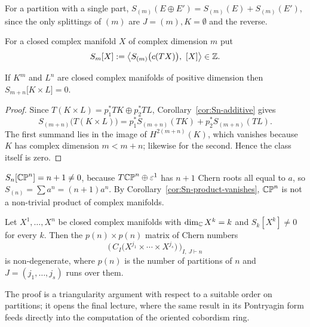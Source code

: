 \begin{corollary}\label{cor:Sn-additive}
For a partition with a single part, $S_{(m)}(E\oplus E')=S_{(m)}(E)+S_{(m)}(E')$,
since the only splittings of $(m)$ are $J=(m),K=\emptyset$ and the reverse.
\end{corollary}

\begin{definition}
For a closed complex manifold $X$ of complex dimension $m$ put
\[
S_m[X]:=\big\langle S_{(m)}\big(c(TX)\big),\ [X]\big\rangle\in\mathbb{Z} .
\]
\end{definition}

\begin{corollary}\label{cor:Sn-product-vanishes}
If $K^m$ and $L^{n}$ are closed complex manifolds of positive dimension then
$S_{m+n}\big[K\times L\big]=0$.
\end{corollary}

\begin{proof}
Since $T(K\times L)=p_1^*TK\oplus p_2^*TL$,
Corollary~\ref{cor:Sn-additive} gives
\[
S_{(m+n)}\big(T(K\times L)\big)
=p_1^*S_{(m+n)}(TK)+p_2^*S_{(m+n)}(TL).
\]
The first summand lies in the image of $H^{2(m+n)}(K)$, which vanishes because
$K$ has complex dimension $m<m+n$; likewise for the second. Hence the class
itself is zero.
\end{proof}

\begin{example}
$S_n[\mathbb{CP}^n]=n+1\neq0$, because $T\mathbb{CP}^n\oplus\varepsilon^1$ has $n+1$ Chern roots all
equal to $a$, so $S_{(n)}=\sum a^n=(n+1)a^n$. By
Corollary~\ref{cor:Sn-product-vanishes}, $\mathbb{CP}^n$ is not a non-trivial product of
complex manifolds.
\end{example}

\begin{theorem}\label{thm:matrix-nondegenerate}
Let $X^1,\dots,X^n$ be closed complex manifolds with $\dim_{\mathbb{C}} X^k=k$ and
$S_k[X^k]\neq0$ for every $k$. Then the $p(n)\times p(n)$ matrix of Chern
numbers
\[
\Big(\,C_I\big(X^{j_1}\times\cdots\times X^{j_s}\big)\,\Big)_{I,\ J\vdash n}
\]
is non-degenerate, where $p(n)$ is the number of partitions of $n$ and
$J=(j_1,\dots,j_s)$ runs over them.
\end{theorem}

The proof is a triangularity argument with respect to a suitable order on
partitions; it opens the final lecture, where the same result in its Pontryagin
form feeds directly into the computation of the oriented cobordism ring.
